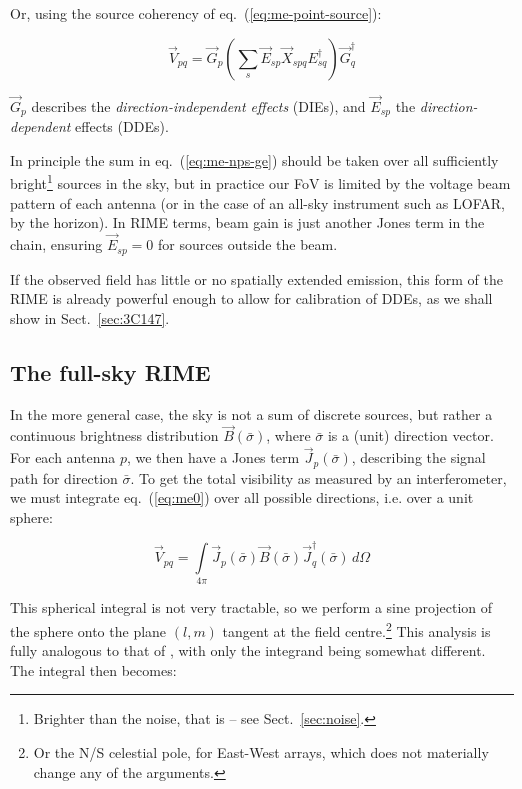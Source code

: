 \documentclass[]{aa}
\begin{document}
Or, using the source coherency of eq.~(\ref{eq:me-point-source}):

  \begin{equation}\label{eq:me-nps-ge}
  \vec V_{pq} = \vec G_p \left ( \sum_{s}{\vec E_{sp} \vec X_{spq} E^\dagger_{sq}} \right ) \vec G^\dagger_q
  \end{equation}

$\vec G_p$ describes the {\em direction-independent effects} (DIEs), and $\vec E_{sp}$ the {\em  direction-dependent} effects (DDEs). 

In principle the sum in eq.~(\ref{eq:me-nps-ge}) should be taken over all sufficiently bright\footnote{Brighter than the noise, that is -- see Sect.~\ref{sec:noise}.} sources in the sky, but in practice our FoV is limited by the voltage beam pattern of each antenna (or in the case of an all-sky instrument such as LOFAR, by the horizon). In RIME terms, beam gain is just another Jones term in the chain, ensuring $\vec E_{sp}=0$ for sources outside the beam.

If the observed field has little or no spatially extended emission, this form of the RIME is already powerful enough to allow for calibration of DDEs, as we shall show in Sect.~\ref{sec:3C147}.

\subsection{The full-sky RIME}

In the more general case, the sky is not a sum of discrete sources, but rather a continuous brightness distribution $\vec B(\bar\sigma)$, where $\bar\sigma$ is a (unit) direction vector. For each antenna $p$, we then have a Jones term $\vec J_p(\bar\sigma)$, describing the signal path for direction $\bar\sigma$. To get the total visibility as measured by an interferometer, we must integrate eq.~(\ref{eq:me0}) over all possible directions, i.e. over a unit sphere:

\[
\vec V_{pq} = \int\limits_{4\pi} \vec J_p(\bar\sigma) \vec B(\bar\sigma) \vec J^\dagger_q(\bar\sigma) \, d\Omega
\]

This spherical integral is not very tractable, so we perform a sine projection of the sphere onto the plane $(l,m)$ tangent at the field centre.\footnote{Or the N/S celestial pole, for East-West arrays, which does not materially change any of the arguments.} This analysis is fully analogous to that of \citet[Sect.~3.1]{tms}, with only the integrand being somewhat different. The integral then becomes:
\end{document}
